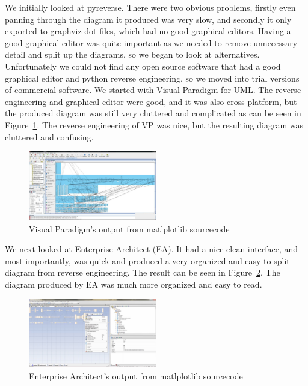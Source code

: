 \documentclass[pdftex,10pt,a4paper]{report}
\begin{document}
We initially looked at pyreverse. There were two obvious problems, firstly even panning through the diagram it produced was very slow, and secondly it only exported to graphviz dot files, which had no good graphical editors. Having a good graphical editor was quite important as we needed to remove unnecessary detail and split up the diagrams, so we began to look at alternatives. Unfortunately we could not find any open source software that had a good graphical editor and python reverse engineering, so we moved into trial versions of commercial software. We started with Visual Paradigm for UML. The reverse engineering and graphical editor were good, and it was also cross platform, but the produced diagram was still very cluttered and complicated as can be seen in Figure~\ref{fig:vp}. The reverse engineering of VP was nice, but the resulting diagram was cluttered and confusing.

\begin{figure}[ht!]
        \centering
                \includegraphics[width=0.5\textwidth]{img/process/vp}
        \caption{Visual Paradigm's output from matlplotlib sourcecode}\label{fig:vp}
\end{figure}

We next looked at Enterprise Architect (EA). It had a nice clean interface, and most importantly, was quick and produced a very organized and easy to split diagram from reverse engineering. The result can be seen in Figure~\ref{fig:ea}. The diagram produced by EA was much more organized and easy to read.

\begin{figure}[ht!]
        \centering
                \includegraphics[width=0.5\textwidth]{img/process/ea}
        \caption{Enterprise Architect's output from matlplotlib sourcecode}\label{fig:ea}
\end{figure}
\end{document}
